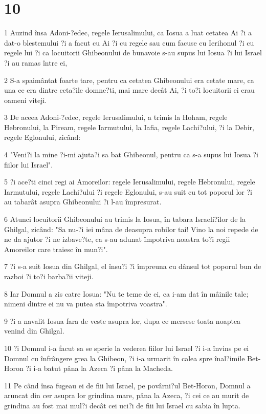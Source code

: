 \chapter{10}

\par 1 Auzind însa Adoni-?edec, regele Ierusalimului, ca Iosua a luat cetatea Ai ?i a dat-o blestemului ?i a facut cu Ai ?i cu regele sau cum facuse cu Ierihonul ?i cu regele lui ?i ca locuitorii Ghibeonului de bunavoie s-au supus lui Iosua ?i lui Israel ?i au ramas între ei,
\par 2 S-a spaimântat foarte tare, pentru ca cetatea Ghibeonului era cetate mare, ca una ce era dintre ceta?ile domne?ti, mai mare decât Ai, ?i to?i locuitorii ei erau oameni viteji.
\par 3 De aceea Adoni-?edec, regele Ierusalimului, a trimis la Hoham, regele Hebronului, la Piream, regele Iarmutului, la Iafia, regele Lachi?ului, ?i la Debir, regele Eglonului, zicând:
\par 4 "Veni?i la mine ?i-mi ajuta?i sa bat Ghibeonul, pentru ca s-a supus lui Iosua ?i fiilor lui Israel".
\par 5 ?i ace?ti cinci regi ai Amoreilor: regele Ierusalimului, regele Hebronului, regele Iarmutului, regele Lachi?ului ?i regele Eglonului, s-au suit cu tot poporul lor ?i au tabarât asupra Ghibeonului ?i l-au împresurat.
\par 6 Atunci locuitorii Ghibeonului au trimis la Iosua, în tabara Israeli?ilor de la Ghilgal, zicând: "Sa nu-?i iei mâna de deasupra robilor tai! Vino la noi repede de ne da ajutor ?i ne izbave?te, ca s-au adunat împotriva noastra to?i regii Amoreilor care traiesc în mun?i".
\par 7 ?i s-a suit Iosua din Ghilgal, el însu?i ?i împreuna cu dânsul tot poporul bun de razboi ?i to?i barba?ii viteji.
\par 8 Iar Domnul a zis catre Iosua: "Nu te teme de ei, ca i-am dat în mâinile tale; nimeni dintre ei nu va putea sta împotriva voastra".
\par 9 ?i a navalit Iosua fara de veste asupra lor, dupa ce mersese toata noaptea venind din Ghilgal.
\par 10 ?i Domnul i-a facut sa se sperie la vederea fiilor lui Israel ?i i-a învins pe ei Domnul cu înfrângere grea la Ghibeon, ?i i-a urmarit în calea spre înal?imile Bet-Horon ?i i-a batut pâna la Azeca ?i pâna la Macheda.
\par 11 Pe când însa fugeau ei de fiii lui Israel, pe povârni?ul Bet-Horon, Domnul a aruncat din cer asupra lor grindina mare, pâna la Azeca, ?i cei ce au murit de grindina au fost mai mul?i decât cei uci?i de fiii lui Israel cu sabia în lupta.
